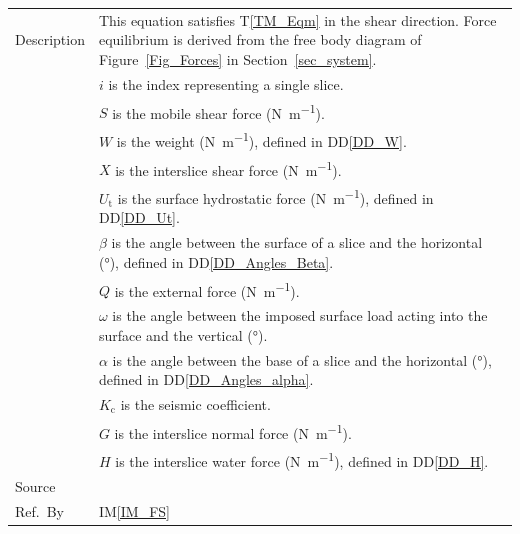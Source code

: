 \documentclass[12pt]{article}
\newcommand{\colAwidth}{0.13\textwidth}
\newcommand{\colBwidth}{0.82\textwidth}
\newcommand{\tref}[1]{T\ref{#1}}
\newcommand{\iref}[1]{IM\ref{#1}}
\newcommand{\ddref}[1]{DD\ref{#1}}
\begin{document}
\begin{minipage}{\textwidth}
\begin{tabular}{| p{\colAwidth} | p{\colBwidth}|}
  \hline Description & This equation satisfies \tref{TM_Eqm} in the shear 
  direction. Force equilibrium is derived from the free body diagram of 
  Figure~\ref{Fig_Forces} in Section~\ref{sec_system}.\\
  &$i$ is the index representing a single slice.\\
  &$S$ is the mobile shear force (\si{\newton\per\meter}). \\
  &$W$ is the weight (\si{\newton\per\meter}), defined in \ddref{DD_W}. \\
  &$X$ is the interslice shear force (\si{\newton\per\meter}). \\
  &$U_\text{t}$ is the surface hydrostatic force (\si{\newton\per\meter}), 
  defined in \ddref{DD_Ut}. \\
  &$\beta$ is the angle between the surface of a slice and the 
  horizontal (\si{\degree}), defined in \ddref{DD_Angles_Beta}. \\
  &$Q$ is the external force (\si{\newton\per\meter}). \\
  &$\omega$ is the angle between the imposed surface load acting into 
  the surface and the vertical (\si{\degree}). \\
  &$\alpha$ is the angle between the base of a slice and the 
  horizontal (\si{\degree}), defined in \ddref{DD_Angles_alpha}. \\
  &$K_\text{c}$ is the seismic coefficient. \\
  &$G$ is the interslice normal force (\si{\newton\per\meter}). \\
  &$H$ is the interslice water force (\si{\newton\per\meter}), defined in 
  \ddref{DD_H}. \\

  \hline Source & \cite{ZhuEtAl2005}\\
  
  \hline Ref.\ By & \iref{IM_FS}\\
  
  \hline
\end{tabular}
\end{minipage}\\

~\newline
\end{document}
